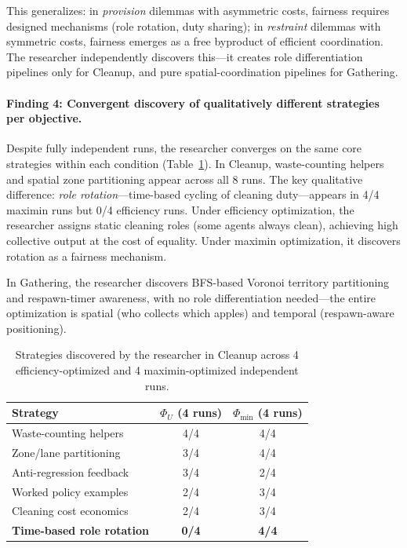 \documentclass[10pt,twocolumn]{article}
\begin{document}
This generalizes: in \emph{provision} dilemmas with asymmetric costs, fairness requires designed mechanisms (role rotation, duty sharing); in \emph{restraint} dilemmas with symmetric costs, fairness emerges as a free byproduct of efficient coordination. The researcher independently discovers this---it creates role differentiation pipelines only for Cleanup, and pure spatial-coordination pipelines for Gathering.

\paragraph{Finding 4: Convergent discovery of qualitatively different strategies per objective.}
Despite fully independent runs, the researcher converges on the same core strategies within each condition (Table~\ref{tab:strategies}). In Cleanup, waste-counting helpers and spatial zone partitioning appear across all 8 runs. The key qualitative difference: \emph{role rotation}---time-based cycling of cleaning duty---appears in 4/4 maximin runs but 0/4 efficiency runs. Under efficiency optimization, the researcher assigns static cleaning roles (some agents always clean), achieving high collective output at the cost of equality. Under maximin optimization, it discovers rotation as a fairness mechanism.

In Gathering, the researcher discovers BFS-based Voronoi territory partitioning and respawn-timer awareness, with no role differentiation needed---the entire optimization is spatial (who collects which apples) and temporal (respawn-aware positioning).

\begin{table}[t]
\caption{Strategies discovered by the researcher in Cleanup across 4 efficiency-optimized and 4 maximin-optimized independent runs.}
\label{tab:strategies}
\centering
\small
\begin{tabular}{@{}lcc@{}}
\toprule
Strategy & $\Phi_U$ (4 runs) & $\Phi_{\min}$ (4 runs) \\
\midrule
Waste-counting helpers & 4/4 & 4/4 \\
Zone/lane partitioning & 3/4 & 4/4 \\
Anti-regression feedback & 3/4 & 2/4 \\
Worked policy examples & 2/4 & 3/4 \\
Cleaning cost economics & 2/4 & 3/4 \\
\textbf{Time-based role rotation} & \textbf{0/4} & \textbf{4/4} \\
\bottomrule
\end{tabular}
\end{table}
\end{document}
